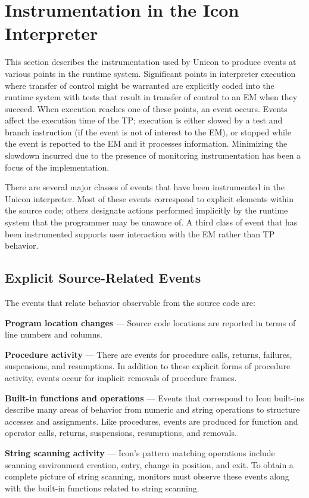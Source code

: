 \section{Instrumentation in the Icon Interpreter}

This section describes the instrumentation used by Unicon to produce
events at various points in the runtime system.  Significant points in
interpreter execution where transfer of control might be warranted are
explicitly coded into the runtime system with tests that result in
transfer of control to an EM when they succeed.  When execution reaches
one of these points, an event occurs.  Events affect the execution
time of the TP; execution is either slowed by a test and branch
instruction (if the event is not of interest to the EM), or stopped
while the event is reported to the EM and it processes information.
Minimizing the slowdown incurred due to the presence of monitoring
instrumentation has been a focus of the implementation.

There are several major classes of events that have been instrumented
in the Unicon interpreter.  Most of these events correspond to explicit
elements within the source code; others designate actions performed
implicitly by the runtime system that the programmer may be unaware of.
A third class of event that has been instrumented supports user
interaction with the EM rather than TP behavior.

\subsection*{Explicit Source-Related Events}

The events that relate behavior observable from the source code are:

\begin{list}{}{\itemsep 7pt} %
\item [{\bf Program location changes}] --- Source code locations are
	reported in terms of line numbers and columns.
\item [{\bf Procedure activity}] --- There are events for procedure calls,
	returns, failures, suspensions,
	and resumptions.  In addition to these explicit forms of
	procedure activity, events occur for implicit removals of
	procedure frames.
\item [{\bf Built-in functions and operations}] --- Events that correspond
	to Icon built-ins describe many areas of behavior from numeric and
	string operations to structure accesses	and assignments.
	Like procedures, events are produced for function and operator calls,
	returns, suspensions, resumptions, and removals.
\item [{\bf String scanning activity}] --- Icon's pattern matching
	operations include scanning environment
	creation, entry, change in position, and exit.  To obtain
	a complete picture of string scanning, monitors must
	observe these events along with the built-in functions
	related to string scanning.
\end{list}

